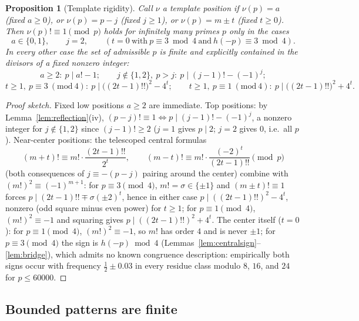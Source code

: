 \documentclass[11pt]{article}
\newtheorem{proposition}[theorem]{Proposition}
\theoremstyle{definition}
\theoremstyle{remark}
\begin{document}
\begin{proposition}[Template rigidity]\label{prop:rigidity}
Call $\nu$ a \emph{template position} if $\nu(p) = a$ (fixed $a \ge 0$), or
$\nu(p) = p - j$ (fixed $j \ge 1$), or $\nu(p) = m \pm t$ (fixed $t \ge 0$).
Then $\nu(p)! \equiv 1 \pmod p$ holds for infinitely many primes $p$
\emph{only} in the cases
\[
  a \in \{0, 1\}, \qquad j = 2, \qquad
  (t = 0 \ \text{with} \ p \equiv 3 \bmod 4 \ \text{and} \
  h(-p) \equiv 3 \bmod 4).
\]
In every other case the set of admissible $p$ is finite and explicitly
contained in the divisors of a fixed nonzero integer:
\[
  a \ge 2:\ p \mid a! - 1; \qquad
  j \notin \{1, 2\},\ p > j:\ p \mid (j-1)! - (-1)^j;
\]
\[
  t \ge 1,\ p \equiv 3 \ (\mathrm{mod}\ 4):\ p \mid \bigl((2t-1)!!\bigr)^2 -
  4^t; \qquad
  t \ge 1,\ p \equiv 1 \ (\mathrm{mod}\ 4):\ p \mid \bigl((2t-1)!!\bigr)^2 +
  4^t.
\]
\end{proposition}

\begin{proof}[Proof sketch]
Fixed low positions $a \ge 2$ are immediate. Top positions: by
Lemma~\ref{lem:reflection}(iv), $(p-j)! \equiv 1 \iff p \mid (j-1)! -
(-1)^j$, a nonzero integer for $j \notin \{1, 2\}$ since $(j-1)! \ge 2$
($j = 1$ gives $p \mid 2$; $j = 2$ gives $0$, i.e.\ all $p$). Near-center
positions: the telescoped central formulas
\[
  (m+t)! \equiv m! \cdot \frac{(2t-1)!!}{2^t}, \qquad
  (m-t)! \equiv m! \cdot \frac{(-2)^t}{(2t-1)!!} \pmod p
\]
(both consequences of $j \equiv -(p - j)$ pairing around the center) combine
with $(m!)^2 \equiv (-1)^{m+1}$: for $p \equiv 3 \pmod 4$,
$m! = \sigma \in \{\pm 1\}$ and $(m \pm t)! \equiv 1$ forces
$p \mid (2t-1)!! \mp \sigma(\pm 2)^t$, hence in either case
$p \mid ((2t-1)!!)^2 - 4^t$, nonzero (odd square minus even power) for
$t \ge 1$; for $p \equiv 1 \pmod 4$, $(m!)^2 \equiv -1$ and squaring gives
$p \mid ((2t-1)!!)^2 + 4^t$. The center itself ($t = 0$): for
$p \equiv 1 \pmod 4$, $(m!)^2 \equiv -1$, so $m!$ has order $4$ and is never
$\pm 1$; for $p \equiv 3 \pmod 4$ the sign is $h(-p) \bmod 4$
(Lemmas~\ref{lem:centralsign}--\ref{lem:bridge}), which admits no known
congruence description: empirically both signs occur with frequency
$\tfrac12 \pm 0.03$ in every residue class modulo $8$, $16$, and $24$ for
$p \le 60000$.
\end{proof}

\subsection{Bounded patterns are finite}
\end{document}

